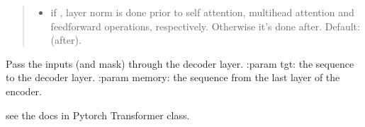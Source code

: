\documentclass[letterpaper,10pt,english]{sphinxmanual}
\begin{document}
\begin{fulllineitems}
\begin{quote}
\begin{description}
\begin{itemize}
\item {} 
\sphinxAtStartPar
{} \textendash{} if , layer norm is done prior to self attention, multihead
attention and feedforward operations, respectively. Otherwise it’s done after.
Default:  (after).

\end{itemize}

\end{description}\end{quote}

\begin{fulllineitems}
\label{\detokenize{beyondml.pt.layers:beyondml.pt.layers.MaskedTransformerDecoderLayer.MaskedTransformerDecoderLayer.forward}}
\pysigstartsignatures
{}
\pysigstopsignatures
\sphinxAtStartPar
Pass the inputs (and mask) through the decoder layer.
:param tgt: the sequence to the decoder layer.
:param memory: the sequence from the last layer of the encoder.
\begin{description}
\sphinxAtStartPar
see the docs in Pytorch Transformer class.

\end{description}

\end{fulllineitems}


\begin{fulllineitems}
\label{\detokenize{beyondml.pt.layers:beyondml.pt.layers.MaskedTransformerDecoderLayer.MaskedTransformerDecoderLayer.prune}}
\pysigstartsignatures
{}
\pysigstopsignatures
\end{fulllineitems}


\end{fulllineitems}
\end{document}
